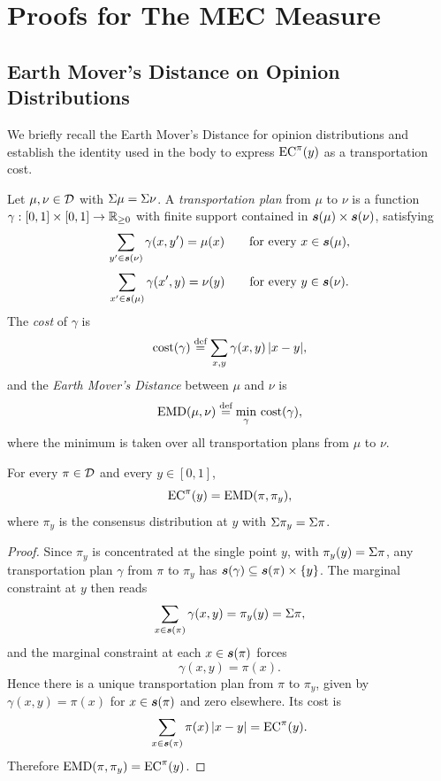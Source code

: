 \section{Proofs for The MEC Measure}
\label{appendix:the-mec-measure-proofs}

\subsection{Earth Mover's Distance on Opinion Distributions}
\label{appendix:emd-definition}

We briefly recall the Earth Mover's Distance for opinion distributions and establish the identity used in the body to express $\ECEMD(y)$ as a transportation cost.

\begin{definition}\label{def:emd}
Let $\mu,\nu\in\mathcal{D}$ with $\Sigma \mu=\Sigma \nu$. A \emph{transportation plan} from $\mu$ to $\nu$ is a function $\gamma:[0,1]\times[0,1]\to\mathbb{R}_{\geq 0}$ with finite support contained in $\boldsymbol{s}(\mu)\times\boldsymbol{s}(\nu)$, satisfying
\[
\sum_{y'\in\boldsymbol{s}(\nu)} \gamma(x,y')=\mu(x)
\qquad\text{for every } x\in\boldsymbol{s}(\mu),
\]
\[
\sum_{x'\in\boldsymbol{s}(\mu)} \gamma(x',y)=\nu(y)
\qquad\text{for every } y\in\boldsymbol{s}(\nu).
\]
The \emph{cost} of $\gamma$ is
\[
\mathrm{cost}(\gamma)\stackrel{\text{def}}{=} \sum_{x,y} \gamma(x,y)\,|x-y|,
\]
and the \emph{Earth Mover's Distance} between $\mu$ and $\nu$ is
\[
\operatorname{EMD}(\mu,\nu)\stackrel{\text{def}}{=} \min_{\gamma}\,\mathrm{cost}(\gamma),
\]
where the minimum is taken over all transportation plans from $\mu$ to $\nu$.
\end{definition}

\begin{lemma}\label{lem:ecemd-as-emd}
For every $\pi\in\mathcal{D}$ and every $y\in[0,1]$,
\[
\ECEMD(y)=\EMD(\pi,\pi_y),
\]
where $\pi_y$ is the consensus distribution at $y$ with $\Sigma \pi_y=\Sigma \pi$.
\end{lemma}

\begin{proof}
Since $\pi_y$ is concentrated at the single point $y$, with $\pi_y(y)=\Sigma \pi$, any transportation plan $\gamma$ from $\pi$ to $\pi_y$ has $\boldsymbol{s}(\gamma)\subseteq\boldsymbol{s}(\pi)\times\{y\}$. The marginal constraint at $y$ then reads
\[
\sum_{x\in\boldsymbol{s}(\pi)} \gamma(x,y)=\pi_y(y)=\Sigma \pi,
\]
and the marginal constraint at each $x\in\boldsymbol{s}(\pi)$ forces
\[
\gamma(x,y)=\pi(x).
\]
Hence there is a unique transportation plan from $\pi$ to $\pi_y$, given by $\gamma(x,y)=\pi(x)$ for $x\in\boldsymbol{s}(\pi)$ and zero elsewhere. Its cost is
\[
\sum_{x\in\support(\pi)} \pi(x)\,|x-y|=\ECEMD(y).
\]
Therefore $\EMD(\pi,\pi_y)=\ECEMD(y)$.
\end{proof}

